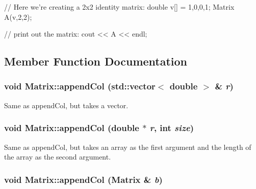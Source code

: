 \begin{DoxyCode}
            // Here we're creating a 2x2 identity matrix:
            double v[] = {1,0,0,1};
            Matrix A(v,2,2);
            
            // print out the matrix:
            cout << A << endl;
\end{DoxyCode}
 

\subsection{Member Function Documentation}
\hypertarget{class_matrix_a726f7ae83284c090af821752628974af}{
\subsubsection[{appendCol}]{\setlength{\rightskip}{0pt plus 5cm}void Matrix::appendCol (std::vector$<$ double $>$ \& {\em r})}}
\label{class_matrix_a726f7ae83284c090af821752628974af}


Same as appendCol, but takes a vector. 

\hypertarget{class_matrix_aae8efe9de26740e3c953e43de55963b2}{
\subsubsection[{appendCol}]{\setlength{\rightskip}{0pt plus 5cm}void Matrix::appendCol (double $\ast$ {\em r}, \/  int {\em size})}}
\label{class_matrix_aae8efe9de26740e3c953e43de55963b2}


Same as appendCol, but takes an array as the first argument and the length of the array as the second argument. 

\hypertarget{class_matrix_a6d7061bb02cf34f6c79a01ff25b41e84}{
\subsubsection[{appendCol}]{\setlength{\rightskip}{0pt plus 5cm}void Matrix::appendCol ({\bf Matrix} \& {\em b})}}
\label{class_matrix_a6d7061bb02cf34f6c79a01ff25b41e84}


